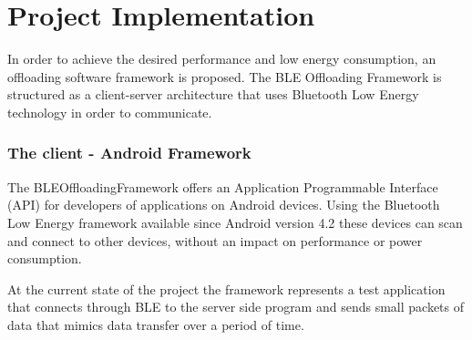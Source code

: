 \chapter{Project Implementation}
\label{chapter:implementation}


In order to achieve the desired performance and low energy consumption, an offloading software framework is proposed. The BLE Offloading Framework is structured as a client-server architecture that uses Bluetooth Low Energy technology in order to communicate.

\subsection{The client - Android Framework}

The BLEOffloadingFramework offers an Application Programmable Interface (API) for developers of applications on Android devices. Using the Bluetooth Low Energy framework available since Android version 4.2 these devices can scan and connect to other devices, without an impact on performance or power consumption.

At the current state of the project the framework represents a test application that connects through BLE to the server side program and sends small packets of data that mimics data transfer over a period of time.



